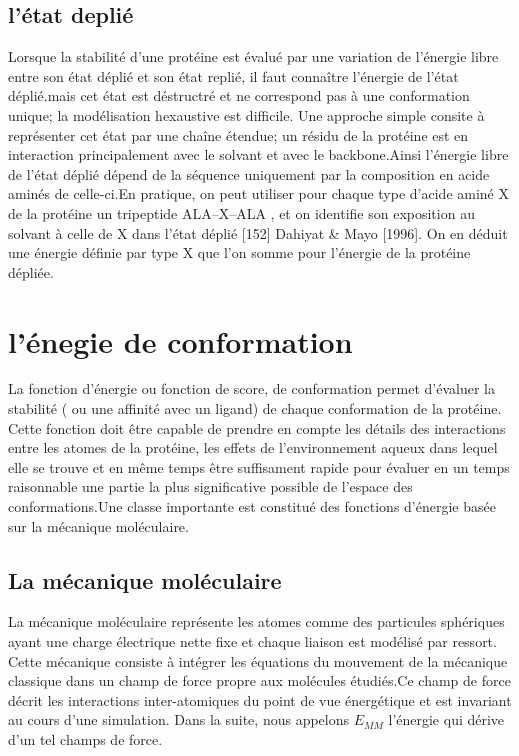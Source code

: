 \subsection{l'état deplié }
Lorsque la stabilité d'une protéine est évalué par une variation de l'énergie libre entre son état déplié et son état replié, il faut connaître l'énergie de l'état déplié.mais cet état est déstructré et ne correspond pas à une conformation unique; la modélisation hexaustive est difficile. Une approche simple consite à représenter cet état par une chaîne étendue; un résidu de la protéine est en interaction principalement avec le solvant et avec le backbone.Ainsi l'énergie libre de l'état déplié dépend de la séquence uniquement par la composition en acide aminés de celle-ci.En pratique, on peut utiliser pour chaque type d'acide aminé X de la protéine  un tripeptide ALA--X--ALA , et on identifie son exposition au solvant à celle de X dans l'état déplié [152] Dahiyat & Mayo [1996]. On en déduit une énergie définie par type X que l'on somme pour l'énergie de la protéine dépliée. 

\section{l'énegie de conformation}

La fonction d'énergie ou fonction de score,  de conformation permet d'évaluer la stabilité ( ou une affinité avec un ligand) de chaque conformation de la protéine. Cette fonction doit être capable de prendre en compte les détails des interactions entre les atomes de la protéine, les effets de l'environnement aqueux  dans lequel elle se trouve et en même temps être suffisament rapide pour évaluer en un temps raisonnable une partie la plus significative possible de l'espace des conformations.Une classe importante est constitué des fonctions d'énergie basée sur la mécanique moléculaire.

\subsection{La mécanique moléculaire}
\label{sub:mecamol}
La mécanique moléculaire représente les atomes comme des particules sphériques ayant une charge électrique nette fixe et chaque liaison est modélisé par ressort.
Cette mécanique consiste à intégrer les équations du mouvement de la mécanique classique dans un champ de force propre aux molécules étudiés.Ce champ de force décrit les interactions inter-atomiques du point de vue énergétique et est invariant au cours d'une simulation.
Dans la suite, nous appelons $E_{MM}$ l'énergie qui dérive d'un tel champs de force.

